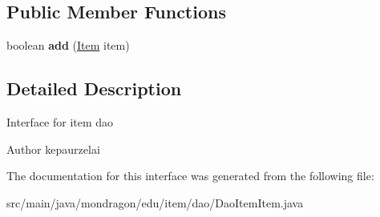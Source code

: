 \subsection*{Public Member Functions}
\begin{DoxyCompactItemize}
\item 
\mbox{\label{interfacemondragon_1_1edu_1_1item_1_1dao_1_1_dao_item_item_aa2ef35f29a0029477b7aa9c236ad2db5}} 
boolean {\bfseries add} (\mbox{\hyperlink{classmondragon_1_1edu_1_1clases_1_1_item}{Item}} item)
\end{DoxyCompactItemize}


\subsection{Detailed Description}
Interface for item dao

\begin{DoxyAuthor}{Author}
kepaurzelai 
\end{DoxyAuthor}


The documentation for this interface was generated from the following file\+:\begin{DoxyCompactItemize}
\item 
src/main/java/mondragon/edu/item/dao/Dao\+Item\+Item.\+java\end{DoxyCompactItemize}
